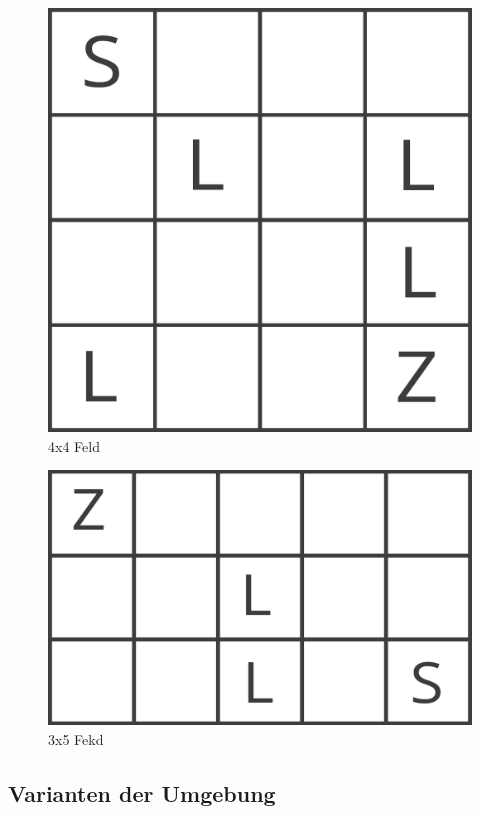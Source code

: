 \begin{figure}[H]
\centering
\includegraphics[width=\textwidth]{Figures/advanced1.png}
\caption{4x4 Feld}
\label{advanced}
\end{figure}

\begin{figure}[H]
\centering
\includegraphics[width=\textwidth]{Figures/advanced2.png}
\caption{3x5 Fekd}
\label{advanced}
\end{figure}

\subsection{Varianten der Umgebung}
\label{subsec:vars}


